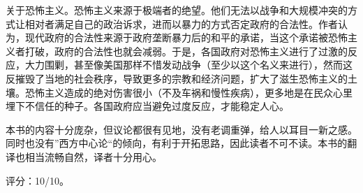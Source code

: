 关于恐怖主义。恐怖主义来源于极端者的绝望。他们无法以战争和大规模冲突的方式让相对者满足自己的政治诉求，进而以暴力的方式否定政府的合法性。作者认为，现代政府的合法性来源于政府垄断暴力后的和平的承诺，当这个承诺被恐怖主义者打破，政府的合法性也就会减弱。于是，各国政府对恐怖主义进行了过激的反应，大力围剿，甚至像美国那样不惜发动战争（至少以这个名义来进行），然而这反摧毁了当地的社会秩序，导致更多的宗教和经济问题，扩大了滋生恐怖主义的土壤。恐怖主义造成的绝对伤害很小（不及车祸和慢性疾病），更多地是在民众心里埋下不信任的种子。各国政府应当避免过度反应，才能稳定人心。

本书的内容十分庞杂，但议论都很有见地，没有老调重弹，给人以耳目一新之感。同时也没有”西方中心论“的倾向，有利于开拓思路，因此读者不可不读。本书的翻译也相当流畅自然，译者十分用心。

评分：10/10。